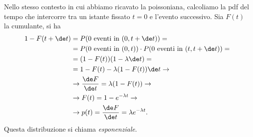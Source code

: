 Nello stesso contesto in cui abbiamo ricavato la poissoniana,
calcoliamo la pdf del tempo che intercorre tra un istante fissato $t=0$ e
l'evento successivo. Sia $F(t)$ la cumulante, si ha
%
\begin{align*}
	1-F(t+\de t)
	&= P(\text{$0$ eventi in $(0,t+\de t)$}) = \\
	&= P(\text{$0$ eventi in $(0,t)$}) \cdot P(\text{$0$ eventi in $(t,t+\de t)$}) = \\
	&= (1-F(t)) (1-\lambda\de t) = \\
	&= 1 - F(t) - \lambda(1-F(t))\de t \rightarrow \\
	&\rightarrow \frac{\de F}{\de t} = \lambda(1-F(t)) \rightarrow \\
	&\rightarrow F(t) = 1 - e^{-\lambda t} \rightarrow \\
	&\rightarrow p(t) = \frac{\de F}{\de t} = \lambda e^{-\lambda t}.
\end{align*}
Questa distribuzione si chiama \emph{esponenziale}.

